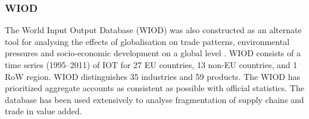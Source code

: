 \subsubsection{WIOD}

The World Input Output Database (WIOD) was also constructed as an alternate tool for analysing the effects of globalisation on trade patterns,
environmental pressures and socio-economic development on a global level \cite{timmer_world_2012}. WIOD consists of a time series (1995–2011) of IOT for 27 EU
countries, 13 non-EU countries, and 1 RoW region. WIOD distinguishes 35
industries and 59 products. The WIOD has prioritized aggregate accounts as consistent as possible with official statistics. The database has been used extensively to analyse fragmentation of supply chains and trade in value added.

    